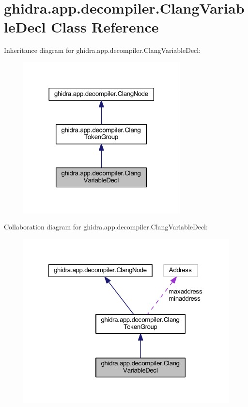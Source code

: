 \hypertarget{classghidra_1_1app_1_1decompiler_1_1_clang_variable_decl}{}\section{ghidra.\+app.\+decompiler.\+Clang\+Variable\+Decl Class Reference}
\label{classghidra_1_1app_1_1decompiler_1_1_clang_variable_decl}


Inheritance diagram for ghidra.\+app.\+decompiler.\+Clang\+Variable\+Decl\+:
\nopagebreak
\begin{figure}[H]
\begin{center}
\leavevmode
\includegraphics[width=242pt]{classghidra_1_1app_1_1decompiler_1_1_clang_variable_decl__inherit__graph}
\end{center}
\end{figure}


Collaboration diagram for ghidra.\+app.\+decompiler.\+Clang\+Variable\+Decl\+:
\nopagebreak
\begin{figure}[H]
\begin{center}
\leavevmode
\includegraphics[width=322pt]{classghidra_1_1app_1_1decompiler_1_1_clang_variable_decl__coll__graph}
\end{center}
\end{figure}
